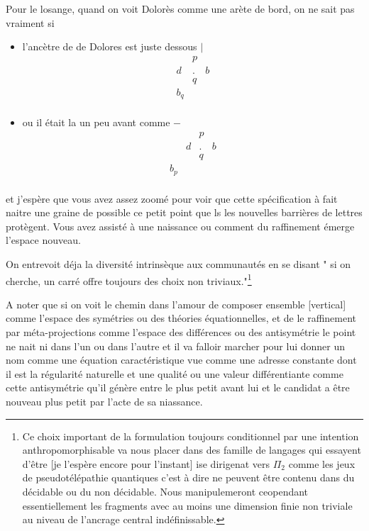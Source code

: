 \documentclass{article}
\begin{document}
Pour le losange, quand on voit Dolorès comme une arète de bord, on ne sait pas vraiment si 

\begin{itemize}
\item  l'ancètre de de Dolores est juste dessous $|$
$$\begin{matrix}
& p &\\
d &.&b\\
&q&\\
b_q&\\
\end{matrix}$$
\item ou il était la un peu avant comme $-$
$$\begin{matrix}
&& p &\\
&d &.&b\\
&&q&\\
b_p&&\\
\end{matrix}$$
\end{itemize}

et j'espère que vous avez assez zoomé pour voir que cette spécification à fait naitre une graine de possible ce petit point que ls les nouvelles barrières de lettres protègent. Vous avez assisté à une naissance ou comment du raffinement émerge l'espace nouveau.



On entrevoit déja   la diversité  intrinsèque aux communautés en se disant " si on cherche, un carré offre toujours des choix non triviaux."\footnote{Ce choix important de la formulation  toujours conditionnel par une intention anthropomorphisable va nous placer dans des famille de langages qui essayent d'être [je l'espère encore pour l'instant]  ise dirigenat vers $\Pi_2$ comme les jeux de pseudotélépathie quantiques c'est à dire ne peuvent être contenu dans du décidable ou du non décidable. Nous manipulemeront ceopendant essentiellement les fragments avec au moins une dimension finie non triviale au niveau de l'ancrage central indéfinissable. }  

A noter que si on voit le chemin dans l'amour de composer ensemble [vertical] comme l'espace des symétries ou des théories équationnelles, et de le raffinement par méta-projections comme l'espace des différences ou des antisymétrie le point ne nait ni dans l'un ou dans l'autre et il va falloir marcher pour lui donner un nom comme une équation caractéristique vue comme une adresse constante dont il est la régularité naturelle et une qualité ou une valeur différentiante comme cette antisymétrie qu'il génère entre le plus petit avant lui et le candidat a être nouveau plus petit par l'acte de sa niassance.
\end{document}

